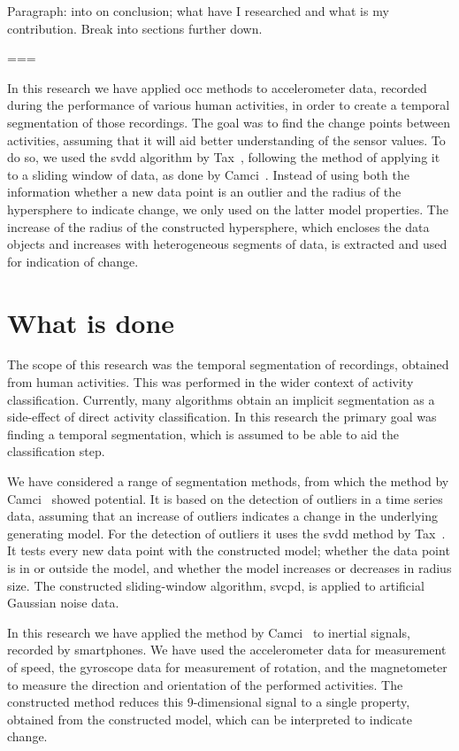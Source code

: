 Paragraph: into on conclusion; what have I researched and what is my contribution.
Break into sections further down.

===

In this research we have applied \gls{occ} methods to accelerometer data, recorded during the performance of various human activities, in order to create a temporal segmentation of those recordings.
The goal was to find the change points between activities, assuming that it will aid better understanding of the sensor values.
To do so, we used the \gls{svdd} algorithm by Tax~\cite{tax1999support}, following the method of applying it to a sliding window of data, as done by Camci~\cite{camci2010change}.
Instead of using both the information whether a new data point is an outlier and the radius of the hypersphere to indicate change, we only used on the latter model properties.
The increase of the radius of the constructed hypersphere, which encloses the data objects and increases with heterogeneous segments of data, is extracted and used for indication of change.



\section{What is done}
The scope of this research was the temporal segmentation of recordings, obtained from human activities.
This was performed in the wider context of activity classification.
Currently, many algorithms obtain an implicit segmentation as a side-effect of direct activity classification.
In this research the primary goal was finding a temporal segmentation, which is assumed to be able to aid the classification step.

We have considered a range of segmentation methods, from which the method by Camci~\cite{camci2010change} showed potential.
It is based on the detection of outliers in a time series data, assuming that an increase of outliers indicates a change in the underlying generating model.
For the detection of outliers it uses the \gls{svdd} method by Tax~\cite{tax1999support}.
It tests every new data point with the constructed model; whether the data point is in or outside the model, and whether the model increases or decreases in radius size.
The constructed sliding-window algorithm, \gls{svcpd}, is applied to artificial Gaussian noise data.

In this research we have applied the method by Camci~\cite{camci2010change} to inertial signals, recorded by smartphones.
We have used the accelerometer data for measurement of speed, the gyroscope data for measurement of rotation, and the magnetometer to measure the direction and orientation of the performed activities.
The constructed method reduces this 9-dimensional signal to a single property, obtained from the constructed model, which can be interpreted to indicate change.

